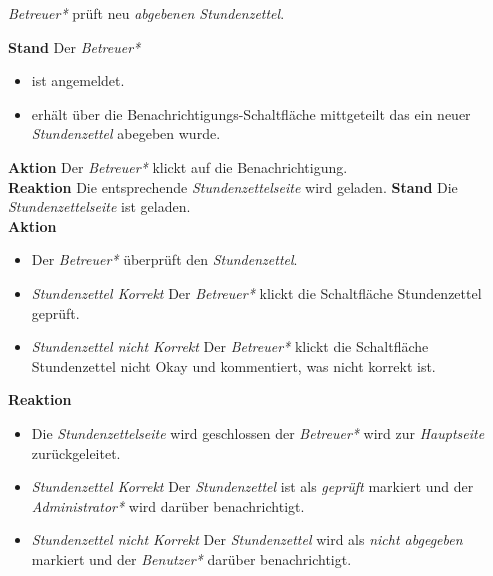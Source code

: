 \begin{requirements}
	 \emph{Betreuer*} prüft neu \emph{abgebenen Stundenzettel}.
	\begin{requirements}
	        \textbf{Stand} Der \emph{Betreuer*}
	            \begin{itemize}
	                \item ist angemeldet.
	                \item erhält über die Benachrichtigungs-Schaltfläche mittgeteilt das ein neuer \emph{Stundenzettel} abegeben wurde.
	            \end{itemize}
            \textbf{Aktion} Der \emph{Betreuer*} klickt auf die Benachrichtigung. \\
            \textbf{Reaktion} Die entsprechende \emph{Stundenzettelseite} wird  geladen.
	        \textbf{Stand} Die \emph{Stundenzettelseite} ist geladen. \\
            \textbf{Aktion}
                \begin{itemize}
                    \item Der \emph{Betreuer*} überprüft den \emph{Stundenzettel}.
                    \item \textit{Stundenzettel Korrekt} Der \emph{Betreuer*} klickt die Schaltfläche Stundenzettel geprüft.
                    \item \textit{Stundenzettel nicht Korrekt}  Der \emph{Betreuer*} klickt die Schaltfläche Stundenzettel nicht Okay und kommentiert, was nicht korrekt ist.
                \end{itemize}
            \textbf{Reaktion}
                \begin{itemize}
                    \item Die \emph{Stundenzettelseite} wird geschlossen der \emph{Betreuer*} wird zur \emph{Hauptseite} zurückgeleitet.
                    \item \textit{Stundenzettel Korrekt} Der \emph{Stundenzettel} ist als \emph{geprüft} markiert und der \emph{Administrator*} wird darüber benachrichtigt.
                    \item \textit{Stundenzettel nicht Korrekt} Der \emph{Stundenzettel} wird als \emph{nicht abgegeben} markiert und der \emph{Benutzer*} darüber benachrichtigt.
                \end{itemize}
	\end{requirements}


\end{requirements}
